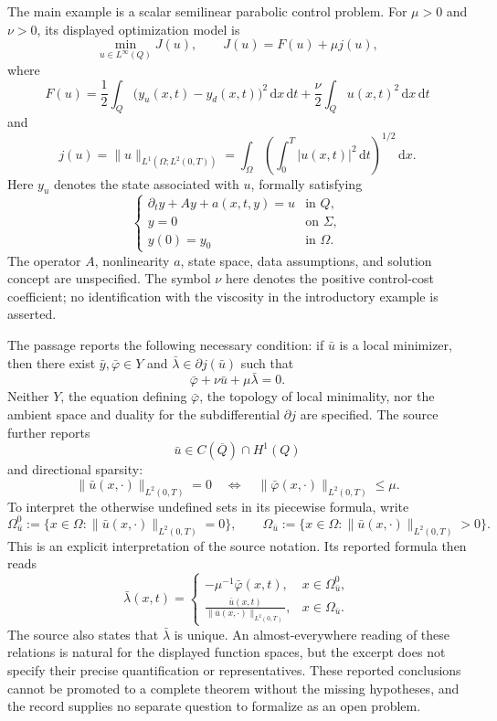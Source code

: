 \documentclass[11pt]{article}
\begin{document}
The main example is a scalar semilinear parabolic control problem. For \(\mu>0\) and \(\nu>0\), its displayed optimization model is
\[
\min_{u\in L^\infty(Q)}J(u),\qquad J(u)=F(u)+\mu j(u),
\]
where
\[
F(u)=\frac12\int_Q\bigl(y_u(x,t)-y_d(x,t)\bigr)^2\,\mathrm{d}x\,\mathrm{d}t
+\frac\nu2\int_Q u(x,t)^2\,\mathrm{d}x\,\mathrm{d}t
\]
and
\[
j(u)=\|u\|_{L^1(\Omega;L^2(0,T))}
=\int_\Omega\left(\int_0^T |u(x,t)|^2\,\mathrm{d}t\right)^{1/2}\,\mathrm{d}x.
\]
Here \(y_u\) denotes the state associated with \(u\), formally satisfying
\[
\begin{cases}
\partial_t y+Ay+a(x,t,y)=u &\text{in }Q,\\
y=0 &\text{on }\Sigma,\\
y(0)=y_0 &\text{in }\Omega.
\end{cases}
\]
The operator \(A\), nonlinearity \(a\), state space, data assumptions, and solution concept are unspecified. The symbol \(\nu\) here denotes the positive control-cost coefficient; no identification with the viscosity in the introductory example is asserted.

The passage reports the following necessary condition: if \(\bar u\) is a local minimizer, then there exist \(\bar y,\bar\varphi\in Y\) and \(\bar\lambda\in\partial j(\bar u)\) such that
\[
\bar\varphi+\nu\bar u+\mu\bar\lambda=0.
\]
Neither \(Y\), the equation defining \(\bar\varphi\), the topology of local minimality, nor the ambient space and duality for the subdifferential \(\partial j\) are specified. The source further reports
\[
\bar u\in C(\overline Q)\cap H^1(Q)
\]
and directional sparsity:
\[
\|\bar u(x,\cdot)\|_{L^2(0,T)}=0
\quad\Longleftrightarrow\quad
\|\bar\varphi(x,\cdot)\|_{L^2(0,T)}\leq\mu.
\]
To interpret the otherwise undefined sets in its piecewise formula, write
\[
\Omega_{\bar u}^{0}:=\{x\in\Omega:\|\bar u(x,\cdot)\|_{L^2(0,T)}=0\},\qquad
\Omega_{\bar u}:=\{x\in\Omega:\|\bar u(x,\cdot)\|_{L^2(0,T)}>0\}.
\]
This is an explicit interpretation of the source notation. Its reported formula then reads
\[
\bar\lambda(x,t)=
\begin{cases}
-\mu^{-1}\bar\varphi(x,t),&x\in\Omega_{\bar u}^{0},\\[2pt]
\displaystyle\frac{\bar u(x,t)}{\|\bar u(x,\cdot)\|_{L^2(0,T)}},&x\in\Omega_{\bar u}.
\end{cases}
\]
The source also states that \(\bar\lambda\) is unique. An almost-everywhere reading of these relations is natural for the displayed function spaces, but the excerpt does not specify their precise quantification or representatives. These reported conclusions cannot be promoted to a complete theorem without the missing hypotheses, and the record supplies no separate question to formalize as an open problem.
\end{document}
